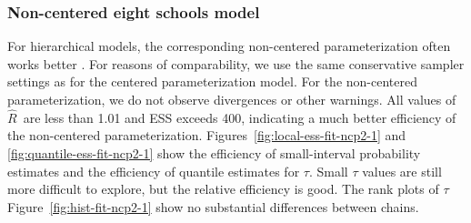 \documentclass[american,]{article}
\newcommand{\Rhat}{$\widehat{R}$}
\theoremstyle{definition}
\begin{document}
\hypertarget{non-centered-eight-schools-model}{%
\subsubsection*{Non-centered eight schools
model}\label{non-centered-eight-schools-model}}

For hierarchical models, the corresponding non-centered
parameterization often works better \citep{Betancourt+Girolami:2019}. 
For reasons of comparability, we use the 
same conservative sampler settings as for the centered parameterization model. 
For the non-centered parameterization, we do not observe divergences or 
other warnings.
All values of \Rhat\ are less than 1.01 and ESS exceeds 400, indicating a much
better efficiency of the non-centered parameterization.
Figures~\ref{fig:local-ess-fit-ncp2-1} and
\ref{fig:quantile-ess-fit-ncp2-1} show the efficiency of small-interval
probability estimates and the efficiency of quantile estimates for
$\tau$.
Small $\tau$ values are still more difficult to explore, but the relative 
efficiency is good. The rank plots of $\tau$ Figure~\ref{fig:hist-fit-ncp2-1} 
show no substantial differences between chains.
\end{document}
